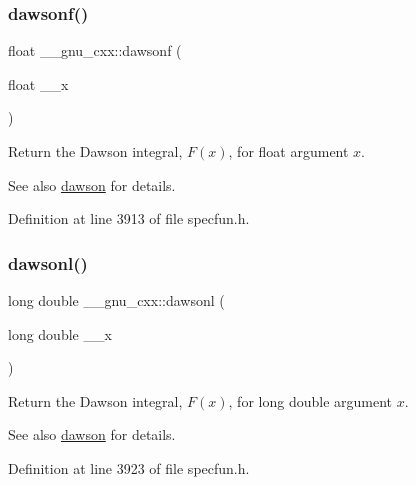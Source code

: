 \subsubsection{\texorpdfstring{dawsonf()}{dawsonf()}}
{\footnotesize\ttfamily float \+\_\+\+\_\+gnu\+\_\+cxx\+::dawsonf (\begin{DoxyParamCaption}\item[{float}]{\+\_\+\+\_\+x }\end{DoxyParamCaption})\hspace{0.3cm}{\ttfamily [inline]}}

Return the Dawson integral, $ F(x) $, for {\ttfamily float} argument $ x $.

\begin{DoxySeeAlso}{See also}
\hyperlink{group__gnu__math__spec__func_gabc97cbc04fdd23593e8dccbc1421dad5}{dawson} for details. 
\end{DoxySeeAlso}


Definition at line 3913 of file specfun.\+h.

\mbox{\label{group__gnu__math__spec__func_ga6647a7444ff9c7c1f2a8ed36761bfeb2}} 
\subsubsection{\texorpdfstring{dawsonl()}{dawsonl()}}
{\footnotesize\ttfamily long double \+\_\+\+\_\+gnu\+\_\+cxx\+::dawsonl (\begin{DoxyParamCaption}\item[{long double}]{\+\_\+\+\_\+x }\end{DoxyParamCaption})\hspace{0.3cm}{\ttfamily [inline]}}

Return the Dawson integral, $ F(x) $, for {\ttfamily long double} argument $ x $.

\begin{DoxySeeAlso}{See also}
\hyperlink{group__gnu__math__spec__func_gabc97cbc04fdd23593e8dccbc1421dad5}{dawson} for details. 
\end{DoxySeeAlso}


Definition at line 3923 of file specfun.\+h.

\mbox{\label{group__gnu__math__spec__func_ga0b14de47c011de3ebf771c9f29b2b78c}} 
